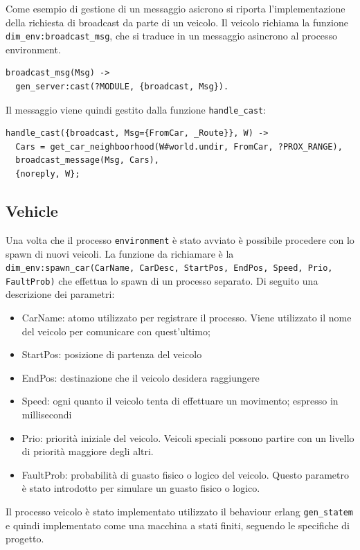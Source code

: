 \documentclass{memoir}
\begin{document}
Come esempio di gestione di un messaggio asicrono si riporta l'implementazione
della richiesta di broadcast da parte di un veicolo. Il veicolo richiama la
funzione \texttt{dim\_env:broadcast\_msg}, che si traduce in un messaggio
asincrono al processo environment.
\begin{verbatim}
broadcast_msg(Msg) ->
  gen_server:cast(?MODULE, {broadcast, Msg}).
\end{verbatim}
Il messaggio viene quindi gestito dalla funzione \texttt{handle\_cast}:
\begin{verbatim}
handle_cast({broadcast, Msg={FromCar, _Route}}, W) ->
  Cars = get_car_neighboorhood(W#world.undir, FromCar, ?PROX_RANGE),
  broadcast_message(Msg, Cars),
  {noreply, W};
\end{verbatim}

\subsection{Vehicle}
Una volta che il processo \texttt{environment} è stato avviato è possibile procedere con lo spawn di nuovi veicoli. La funzione da richiamare è la \texttt{dim\_env:spawn\_car(CarName, CarDesc, StartPos, EndPos, Speed, Prio, FaultProb)} che effettua lo spawn di un processo separato. Di seguito una descrizione dei parametri:
\begin{itemize}
\item CarName: atomo utilizzato per registrare il processo. Viene utilizzato il nome del veicolo per comunicare con quest'ultimo;
\item StartPos: posizione di partenza del veicolo
\item EndPos: destinazione che il veicolo desidera raggiungere
\item Speed: ogni quanto il veicolo tenta di effettuare un movimento; espresso in millisecondi
\item Prio: priorità iniziale del veicolo. Veicoli speciali possono partire con un livello di priorità maggiore degli altri.
\item FaultProb: probabilità di guasto fisico o logico del veicolo. Questo parametro è stato introdotto per simulare un guasto fisico o logico.
\end{itemize}
Il processo veicolo è stato implementato utilizzato il behaviour erlang \texttt{gen\_statem} e quindi implementato come una macchina a stati finiti, seguendo le specifiche di progetto.
\end{document}
